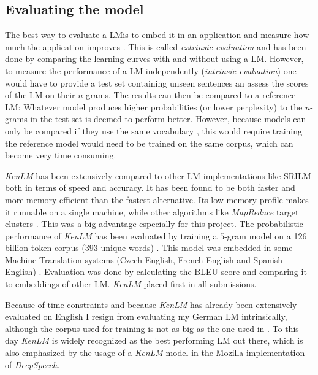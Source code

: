 \subsection{Evaluating the model}

The best way to evaluate a \ac{LM}is to embed it in an application and measure how much the application improves \parencite{slp3}. This is called \textit{extrinsic evaluation} and has been done by comparing the learning curves with and without using a \ac{LM}. However, to measure the performance of a \ac{LM} independently (\textit{intrinsic evaluation}) one would have to provide a test set containing unseen sentences an assess the scores of the \ac{LM} on their $n$-grams. The results can then be compared to a reference \ac{LM}: Whatever model produces higher probabilities (or lower perplexity) to the $n$-grams in the test set is deemed to perform better. However, because models can only be compared if they use the same vocabulary \parencite{slp3}, this would require training the reference model would need to be trained on the same corpus, which can become very time consuming.

\textit{KenLM} has been extensively compared to other \ac{LM} implementations like \ac{SRILM} both in terms of speed and accuracy. It has been found to be both faster and more memory efficient \parencite{kenlm} than the fastest alternative. Its low memory profile makes it runnable on a single machine, while other algorithms like \textit{MapReduce} target clusters \parencite{kenlm_estimation}. This was a big advantage especially for this project. The probabilistic performance of \textit{KenLM} has been evaluated by training a $5$-gram model on a 126 billion token corpus (393 unique words) \parencite{kenlm_estimation}. This model was embedded in some Machine Translation systems (Czech-English, French-English and Spanish-English) . Evaluation was done by calculating the BLEU score and comparing it to embeddings of other \ac{LM}. \textit{KenLM} placed first in all submissions.

Because of time constraints and because \textit{KenLM} has already been extensively evaluated on English I resign from evaluating my German \ac{LM} intrinsically, although the corpus used for training is not as big as the one used in \cite{kenlm_estimation}. To this day \textit{KenLM} is widely recognized as the best performing \ac{LM} out there, which is also emphasized by the usage of a \textit{KenLM} model in the Mozilla implementation of \textit{DeepSpeech}.


